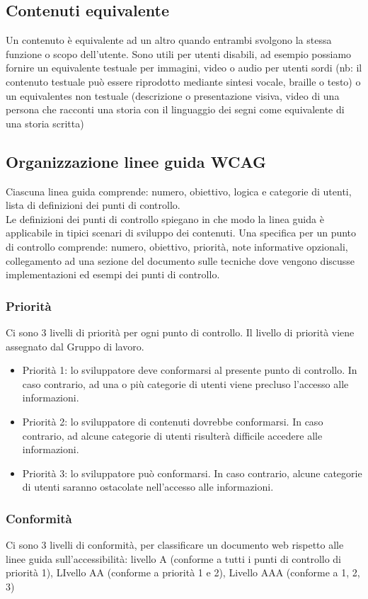\documentclass{article}
\begin{document}
\subsection{Contenuti equivalente}
Un contenuto è equivalente ad un altro quando entrambi svolgono la stessa funzione o scopo dell'utente. Sono utili per utenti disabili, ad esempio possiamo fornire un equivalente testuale per immagini, video o audio per utenti sordi (nb: il contenuto testuale può essere riprodotto mediante sintesi vocale, braille o testo) o un equivalentes non testuale (descrizione o presentazione visiva, video di una persona che racconti una storia con il linguaggio dei segni come equivalente di una storia scritta) 
\subsection{Organizzazione linee guida WCAG}
Ciascuna linea guida comprende: numero, obiettivo, logica e categorie di utenti, lista di definizioni dei punti di controllo.\\
Le definizioni dei punti di controllo spiegano in che modo la linea guida è applicabile in tipici scenari di sviluppo dei contenuti. Una specifica per un punto di controllo comprende: numero, obiettivo, priorità, note informative opzionali, collegamento ad una sezione del documento sulle tecniche dove vengono discusse implementazioni ed esempi dei punti di controllo.
\subsubsection{Priorità}
Ci sono 3 livelli di priorità per ogni punto di controllo. Il livello di priorità viene assegnato dal Gruppo di lavoro.
\begin{itemize}
	\item Priorità 1: lo sviluppatore deve conformarsi al presente punto di controllo. In caso contrario, ad una o più categorie di utenti viene precluso l'accesso alle informazioni.
	\item Priorità 2: lo sviluppatore di contenuti dovrebbe conformarsi. In caso contrario, ad alcune categorie di utenti risulterà difficile accedere alle informazioni.
	\item Priorità 3: lo sviluppatore può conformarsi. In caso contrario, alcune categorie di utenti saranno ostacolate nell'accesso alle informazioni.
\end{itemize}
\subsubsection{Conformità}
Ci sono 3 livelli di conformità, per classificare un documento web rispetto alle linee guida sull'accessibilità: livello A (conforme a tutti i punti di controllo di priorità 1), LIvello AA (conforme a priorità 1 e 2), Livello AAA (conforme a 1, 2, 3)
\end{document}
